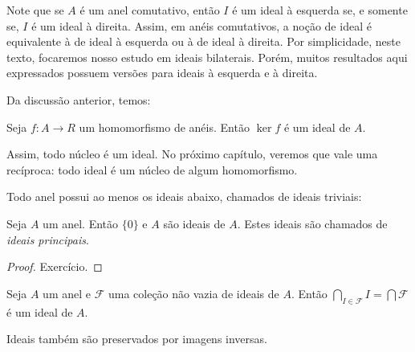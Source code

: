 Note que se $A$ é um anel comutativo, então $I$ é um ideal à esquerda se, e somente se, $I$ é um ideal à direita.
Assim, em anéis comutativos, a noção de ideal é equivalente à de ideal à esquerda ou à de ideal à direita.
Por simplicidade, neste texto, focaremos nosso estudo em ideais bilaterais.
Porém, muitos resultados aqui expressados possuem versões para ideais à esquerda e à direita.

Da discussão anterior, temos:

\begin{corol}
    Seja $f:A\rightarrow R$ um homomorfismo de anéis. Então $\ker f$ é um ideal de $A$.
\end{corol}

Assim, todo núcleo é um ideal.
No próximo capítulo, veremos que vale uma recíproca: todo ideal é um núcleo de algum homomorfismo.

Todo anel possui ao menos os ideais abaixo, chamados de ideais triviais:

\begin{prop}Seja $A$ um anel. Então $\{0\}$ e $A$ são ideais de $A$. Estes ideais são chamados de \emph{ideais principais}.
\end{prop}
\begin{proof}
    Exercício.
\end{proof}

\begin{prop}
    Seja $A$ um anel e $\mathcal F$ uma coleção não vazia de ideais de $A$. Então $\bigcap_{I \in \mathcal F}I=\bigcap \mathcal F$ é um ideal de $A$.
\end{prop}

Ideais também são preservados por imagens inversas.

